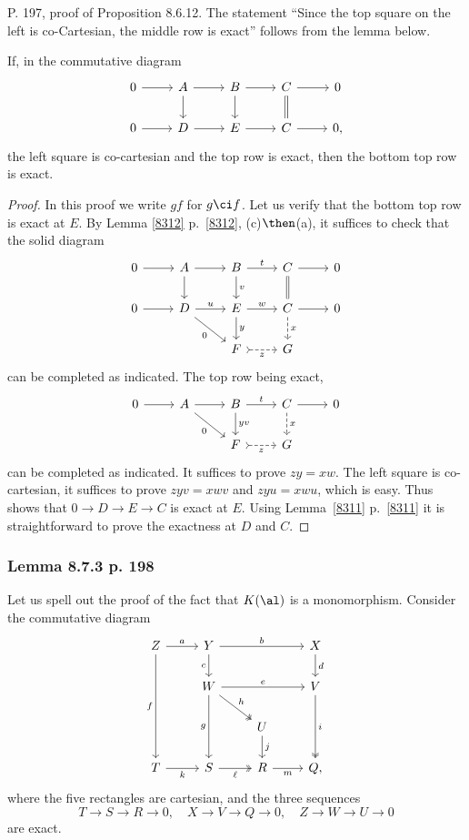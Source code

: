 \documentclass[12pt]{article}
\theoremstyle{remark}
\theoremstyle{definition}
\begin{document}
\begin{s} 
P. 197, proof of Proposition 8.6.12. The statement ``Since the top square on the left is co-Cartesian, the middle row is exact'' follows from the lemma below.

\begin{lem}
If, in the commutative diagram 
$$
\begin{tikzcd}
0\ar[r]&A\ar[d]\ar[r]&B\ar[d]\ar[r]&C\ar[d,equal]\ar[r]&0\\ 
0\ar[r]&D\ar[r]&E\ar[r]&C\ar[r]&0,
\end{tikzcd}
$$ 
the left square is co-cartesian and the top row is exact, then the bottom top row is exact.
\end{lem} 
\begin{proof}
In this proof we write $gf$ for $g\ci f$. Let us verify that the bottom top row is exact at $E$. By Lemma \ref{8312} p.~\ref{8312}, (c)$\then$(a), it suffices to check that the solid diagram 
$$
\begin{tikzcd}
0\ar[r]&A\ar[d]\ar[r]&B\ar[d,"v"]\ar[r,"t"]&C\ar[d,equal]\ar[r]&0\\ 
0\ar[r]&D\ar[rd,"0"']\ar[r,"u"]&E\ar[d,"y"]\ar[r,"w"]&C\ar[d,"x",dashed]\ar[r]&0\\ 
&&F\ar[r,"z"',dashed,rightarrowtail]&G
\end{tikzcd}
$$ 
can be completed as indicated. The top row being exact, 
$$
\begin{tikzcd}
0\ar[r]&A\ar[rd,"0"']\ar[r]&B\ar[d,"yv"]\ar[r,"t"]&C\ar[d,"x",dashed]\ar[r]&0\\ 
&&F\ar[r,"z"',dashed,rightarrowtail]&G
\end{tikzcd}
$$ 
can be completed as indicated. It suffices to prove $zy=xw$. The left square is co-cartesian, it suffices to prove $zyv=xwv$ and $zyu=xwu$, which is easy. Thus shows that $0\to D\to E\to C$ is exact at $E$. Using Lemma~\ref{8311} p.~\ref{8311} it is straightforward to prove the exactness at $D$ and $C$.
\end{proof}
\end{s}



\subsubsection{Lemma 8.7.3 p. 198}

Let us spell out the proof of the fact that $K(\al)$ is a monomorphism. Consider the commutative diagram 
$$
\begin{tikzcd} 
Z\ar[ddd,"f"']\ar[r,"a"]&Y\ar[d,"c"']\ar[rr,"b"]&&X\ar[d,"d"]\\ 
&W\ar[dd,"g"']\ar[rd,twoheadrightarrow,"h"]\ar[rr,"e"]&&V\ar[dd,twoheadrightarrow,"i"]\\ 
&&U\ar[d,"j"]\\ 
T\ar[r,"k"']&S\ar[r,twoheadrightarrow,"\ell"']&R\ar[r,"m"']&Q,
\end{tikzcd}
$$ 
where the five rectangles are cartesian, and the three sequences 
$$
T\to S\to R\to 0,\quad X\to V\to Q\to 0,\quad Z\to W\to U\to 0
$$ 
are exact. 
\end{document}
